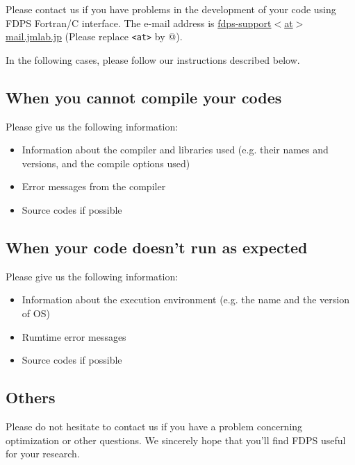 Please contact us if you have problems in the development of your code using FDPS Fortran/C interface. The e-mail address is \href{mailto:fdps-support@mail.jmlab.jp}{fdps-support$<$at$>$mail.jmlab.jp} (Please replace \texttt{<at>} by @).

In the following cases, please follow our instructions described below.

\subsection{When you cannot compile your codes}
Please give us the following information:
\begin{itemize}
\item Information about the compiler and libraries used (e.g. their names and versions, and the compile options used)
\item Error messages from the compiler
\item Source codes if possible
\end{itemize}

\subsection{When your code doesn't run as expected}
Please give us the following information:
\begin{itemize}
\item Information about the execution environment (e.g. the name and the version of OS)
\item Rumtime error messages
\item Source codes if possible
\end{itemize}

\subsection{Others}
Please do not hesitate to contact us if you have a problem concerning optimization or other questions. We sincerely hope that you'll find FDPS useful for your research.
